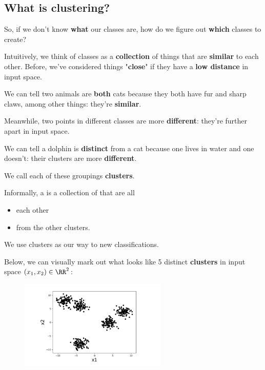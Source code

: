     \subsection{What is clustering?}
    
        So, if we don't know \textbf{what} our classes are, how do we figure out \textbf{which} classes to create?
        
        Intuitively, we think of classes as a \textbf{collection} of things that are \textbf{similar} to each other. Before, we've considered things "\textbf{close}" if they have a \textbf{low distance} in input space.
            
        \miniex We can tell two animals are \textbf{both} cats because they both have fur and sharp claws, among other things: they're \textbf{similar}.
            
        Meanwhile, two points in different classes are more \textbf{different}: they're further apart in input space. 
        
        \miniex We can tell a dolphin is \textbf{distinct} from a cat because one lives in water and one doesn't: their clusters are more \textbf{different}.
        
        We call each of these groupings \textbf{clusters}.\\
        
        \begin{definition}
            Informally, a  is a collection of  that are all 
            \begin{itemize}
                \item {} each other
                
                \item {} from the other clusters.
            \end{itemize}
            
            We use clusters as our way to  new classifications.
        \end{definition}
        
        \miniex Below, we can visually mark out what looks like 5 distinct \textbf{clusters} in input space $(x_1,x_2) \in \RR^2$:
        
        \begin{figure}[H]
            \centering
            \includegraphics[width=70mm,scale=0.4]{images/clustering_images/clustering_example.png}
        \end{figure}
        
